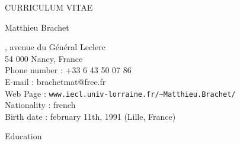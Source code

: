 \documentclass[10pt,a4paper]{report}
\begin{document}
\begin{center}
{\selectfont
\begin{LARGE}
CURRICULUM VITAE
\end{LARGE}

\begin{large}
Matthieu Brachet
\end{large}

\hrulefill
}
\end{center}

, avenue du Général Leclerc\\
54 000 Nancy, France
\vspace{0.2cm}\\
Phone number : +33 6 43 50 07 86\\
E-mail : brachetmat@free.fr\\
Web Page : \verb?www.iecl.univ-lorraine.fr/~Matthieu.Brachet/?
\vspace{0.2cm}\\
Nationality : french\\
Birth date : february 11th, 1991 (Lille, France)


\vspace{1cm}
\noindent
{\selectfont
\begin{Large}
Education
\end{Large}
\hrulefill
}

\vspace{0.6cm}
\end{document}

